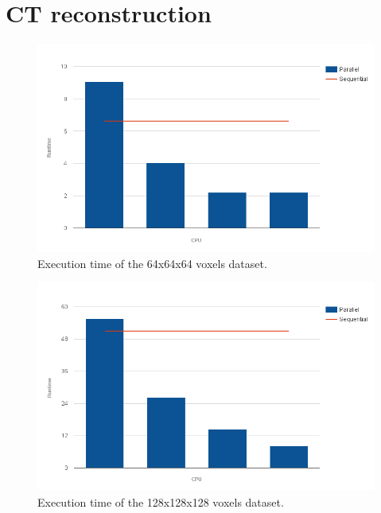 \section{CT reconstruction} \label{app:fdk}
\begin{figure}[h!]
	\centering
	\includegraphics[scale=0.4]{img/fdk-64.png}
	\caption[]{Execution time of the 64x64x64 voxels dataset. \label{fig:fdk-64}}
\end{figure}

\begin{figure}[h!]
	\centering
	\includegraphics[scale=0.4]{img/fdk-128.png}
	\caption[]{Execution time of the 128x128x128 voxels dataset. \label{fig:fdk-128}}
\end{figure}

